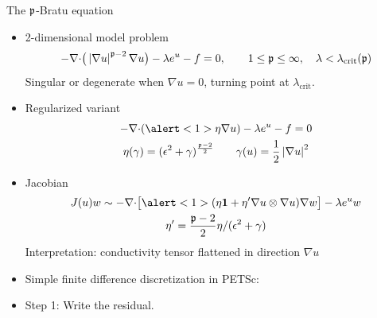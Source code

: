 \documentclass{beamer}
\begin{document}
\begin{frame}{The ${\mathfrak p}$-Bratu equation}
  \begin{itemize}
  \item 2-dimensional model problem
    \begin{equation*}
      -{\nabla \cdot} \big(\left\lvert \nabla u \right\rvert^{{\mathfrak p}-2} \nabla u \big) - \lambda e^u - f = 0, \qquad 1 \le {\mathfrak p} \le \infty, \quad \lambda < \lambda_{\text{crit}}({\mathfrak p})
    \end{equation*}
    Singular or degenerate when $\nabla u = 0$, turning point at $\lambda_{\text{crit}}$.
  \item Regularized variant
    \begin{gather*}
      -\div (\alert<1>{\eta} \nabla u) - \lambda e^u - f = 0 \\
      \eta(\gamma) = (\epsilon^2 + \gamma)^{\frac{\pfrak-2}{2}} \qquad \gamma(u) = \half \abs{\nabla u}^2
    \end{gather*}
  \item Jacobian
    \begin{gather*}
      J(u) w \sim -\div \big[ \alert<1>{(\eta \bm 1 + \eta' \nabla u \otimes \nabla u)} \nabla w \big] - \lambda e^u w \\
      \eta' = \frac{\pfrak-2}{2} \eta / (\epsilon^2 + \gamma)
    \end{gather*}
    Interpretation: conductivity tensor flattened in direction $\nabla u$ %
  \item Simple finite difference discretization in PETSc: \\
  \item<2> \alert{Step 1: Write the residual.}
  \end{itemize}
\end{frame}
\end{document}
